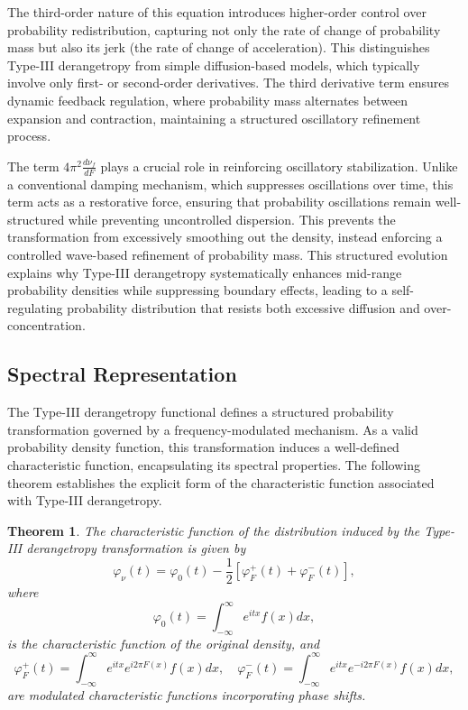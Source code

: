 \documentclass[sn-mathphys-num]{sn-jnl}%
\theoremstyle{thmstyleone}%
\newtheorem{theorem}{Theorem}%
\theoremstyle{thmstyletwo}%
\theoremstyle{thmstylethree}%
\begin{document}
The third-order nature of this equation introduces higher-order control over probability redistribution, capturing not only the rate of change of probability mass but also its jerk (the rate of change of acceleration). This distinguishes Type-III derangetropy from simple diffusion-based models, which typically involve only first- or second-order derivatives. The third derivative term ensures dynamic feedback regulation, where probability mass alternates between expansion and contraction, maintaining a structured oscillatory refinement process.

The term $4 \pi^2 \frac{d \nu_f}{d F}$ plays a crucial role in reinforcing oscillatory stabilization. Unlike a conventional damping mechanism, which suppresses oscillations over time, this term acts as a restorative force, ensuring that probability oscillations remain well-structured while preventing uncontrolled dispersion. This prevents the transformation from excessively smoothing out the density, instead enforcing a controlled wave-based refinement of probability mass. This structured evolution explains why Type-III derangetropy systematically enhances mid-range probability densities while suppressing boundary effects, leading to a self-regulating probability distribution that resists both excessive diffusion and over-concentration. 





\subsection{Spectral Representation}

The Type-III derangetropy functional defines a structured probability transformation governed by a frequency-modulated mechanism. As a valid probability density function, this transformation induces a well-defined characteristic function, encapsulating its spectral properties. The following theorem establishes the explicit form of the characteristic function associated with Type-III derangetropy.

\begin{theorem}
	The characteristic function of the distribution induced by the Type-III derangetropy transformation is given by
	$$
	\varphi_{\nu}(t)=\varphi_0(t)-\frac{1}{2}\left[\varphi_F^{+}(t)+\varphi_F^{-}(t)\right],
	$$	
	where
	$$
	\varphi_0(t)=\int_{-\infty}^{\infty} e^{i t x} f(x) d x,
	$$	
	is the characteristic function of the original density, and	
	$$
	\varphi_F^{+}(t)=\int_{-\infty}^{\infty} e^{i t x} e^{i 2 \pi F(x)} f(x) d x, \quad \varphi_F^{-}(t)=\int_{-\infty}^{\infty} e^{i t x} e^{-i 2 \pi F(x)} f(x) d x,
	$$	
	are modulated characteristic functions incorporating phase shifts.
\end{theorem}
\end{document}
